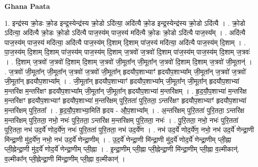 \documentclass[17pt]{extarticle}
\begin{document}
\textbf{Ghana Paata } \newline

1. इन्द्र॑स्य क्रो॒डः क्रो॒ड इन्द्र॒स्येन्द्र॑स्य क्रो॒डो ऽदि॑त्या॒ अदि॑त्यै क्रो॒ड इन्द्र॒स्येन्द्र॑स्य क्रो॒डो ऽदि॑त्यै । . क्रो॒डो ऽदि॑त्या॒ अदि॑त्यै क्रो॒डः क्रो॒डो ऽदि॑त्यै पाज॒स्य॑म् पाज॒स्य॑ मदि॑त्यै क्रो॒डः क्रो॒डो ऽदि॑त्यै पाज॒स्य᳚म् । . अदि॑त्यै पाज॒स्य॑म् पाज॒स्य॑ मदि॑त्या॒ अदि॑त्यै पाज॒स्य॑म् दि॒शाम् दि॒शाम् पा॑ज॒स्य॑ मदि॑त्या॒ अदि॑त्यै पाज॒स्य॑म् दि॒शाम् । . पा॒ज॒स्य॑म् दि॒शाम् दि॒शाम् पा॑ज॒स्य॑म् पाज॒स्य॑म् दि॒शाम् ज॒त्रवो॑ ज॒त्रवो॑ दि॒शाम् पा॑ज॒स्य॑म् पाज॒स्य॑म् दि॒शाम् ज॒त्रवः॑ । . दि॒शाम् ज॒त्रवो॑ ज॒त्रवो॑ दि॒शाम् दि॒शाम् ज॒त्रवो॑ जी॒मूता᳚न् जी॒मूता᳚न् ज॒त्रवो॑ दि॒शाम् दि॒शाम् ज॒त्रवो॑ जी॒मूतान्॑ । . ज॒त्रवो॑ जी॒मूता᳚न् जी॒मूता᳚न् ज॒त्रवो॑ ज॒त्रवो॑ जी॒मूता᳚न् हृदयौप॒शाभ्याꣳ॑ हृदयौप॒शाभ्या᳚म् जी॒मूता᳚न् ज॒त्रवो॑ ज॒त्रवो॑ जी॒मूता᳚न् हृदयौप॒शाभ्या᳚म् । . जी॒मूता᳚न् हृदयौप॒शाभ्याꣳ॑ हृदयौप॒शाभ्या᳚म् जी॒मूता᳚न् जी॒मूता᳚न् हृदयौप॒शाभ्या॑ म॒न्तरि॑क्ष म॒न्तरि॑क्षꣳ हृदयौप॒शाभ्या᳚म् जी॒मूता᳚न् जी॒मूता᳚न् हृदयौप॒शाभ्या॑ म॒न्तरि॑क्षम् । . हृ॒द॒यौ॒प॒शाभ्या॑ म॒न्तरि॑क्ष म॒न्तरि॑क्षꣳ हृदयौप॒शाभ्याꣳ॑ हृदयौप॒शाभ्या॑ म॒न्तरि॑क्षम् पुरि॒तता॑ पुरि॒तता॒ ऽन्तरि॑क्षꣳ हृदयौप॒शाभ्याꣳ॑ हृदयौप॒शाभ्या॑ म॒न्तरि॑क्षम् पुरि॒तता᳚ । . हृ॒द॒यौ॒प॒शाभ्या॒मिति॑ हृदय - औ॒प॒शाभ्या᳚म् । . अ॒न्तरि॑क्षम् पुरि॒तता॑ पुरि॒तता॒ ऽन्तरि॑क्ष म॒न्तरि॑क्षम् पुरि॒तता॒ नभो॒ नभः॑ पुरि॒तता॒ ऽन्तरि॑क्ष म॒न्तरि॑क्षम् पुरि॒तता॒ नभः॑ । . पु॒रि॒तता॒ नभो॒ नभः॑ पुरि॒तता॑ पुरि॒तता॒ नभ॑ उद॒र्ये॑ णोद॒र्ये॑ण॒ नभः॑ पुरि॒तता॑ पुरि॒तता॒ नभ॑ उद॒र्ये॑ण । . नभ॑ उद॒र्ये॑ णोद॒र्ये॑ण॒ नभो॒ नभ॑ उद॒र्ये॑ णेन्द्रा॒णी मि॑न्द्रा॒णी मु॑द॒र्ये॑ण॒ नभो॒ नभ॑ उद॒र्ये॑
णेन्द्रा॒णीम् । . उ॒द॒र्ये॑ णेन्द्रा॒णी मि॑न्द्रा॒णी मु॑द॒र्ये॑ णोद॒र्ये॑ णेन्द्रा॒णीम् प्ली॒ह्ना प्ली॒ह्नेन्द्रा॒णी मु॑द॒र्ये॑ णोद॒र्ये॑
णेन्द्रा॒णीम् प्ली॒ह्ना । . इ॒न्द्रा॒णीम् प्ली॒ह्ना प्ली॒ह्नेन्द्रा॒णी मि॑न्द्रा॒णीम् प्ली॒ह्ना व॒ल्मीकान्॑. व॒ल्मीका᳚न् प्ली॒ह्नेन्द्रा॒णी मि॑न्द्रा॒णीम् प्ली॒ह्ना व॒ल्मीकान्॑ । \newline
\end{document}
